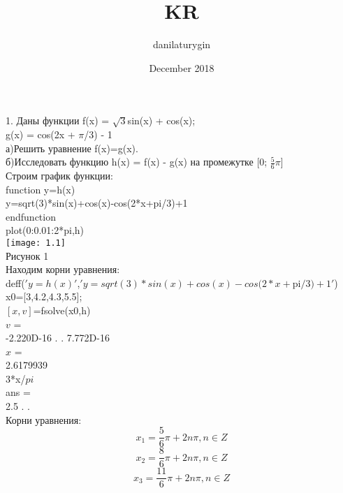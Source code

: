 \documentclass[russian, utf8, nocolumnxxxi, nocolumnxxxii]{eskdtext}
\title{KR}
\author{danilaturygin}
\date{December 2018}
\begin{document}
1. Даны функции f(x) = $\sqrt{3}$sin(x) + cos(x); \\
g(x) = cos(2x + $\pi$/3) - 1 \\
а)Решить уравнение f(x)=g(x). \\
б)Исследовать функцию h(x) = f(x) - g(x) на промежутке [0; $\frac{5}{6}$$\pi$] \\
Строим график функции:\\
function y=h(x) \\
y=sqrt(3)*sin(x)+cos(x)-cos(2*x+pi/3)+1 \\
endfunction \\
plot(0:0.01:2*pi,h) \\
\texttt{[image: 1.1]} \\
Рисунок 1 \\
Находим корни уравнения: \\
deff($'y=h(x)'$,$'y=sqrt(3)*sin(x)+cos(x)-cos(2*x+$pi$/3)+1'$) \\
x0=[3,4.2,4.3,5.5]; \\
$[x,v]$=fsolve(x0,h) \\
 $v$  = \\
-2.220D-16 . . \quad 7.772D-16 \\
 $x$  = \\
   2.6179939    \\
3*x/$pi$ \\
 ans  = \\
   2.5 . . \\
Корни уравнения:\\
$$x_1 = \frac{5}{6}\pi + 2n\pi, n \in Z$$
$$x_2 = \frac{8}{6}\pi + 2n\pi, n \in Z$$
$$x_3 = \frac{11}{6}\pi + 2n\pi, n \in Z$$
\end{document}
